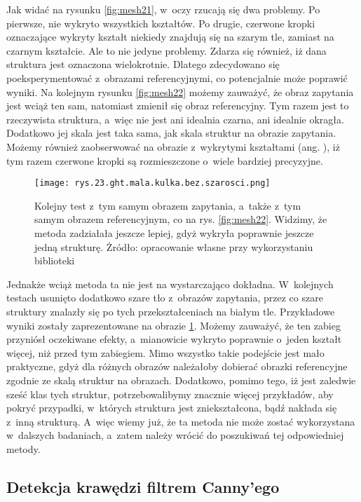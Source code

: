 Jak widać na rysunku \ref{fig:mesh21}, w~oczy rzucają się dwa problemy. Po pierwsze, nie wykryto wszystkich kształtów. Po drugie, czerwone kropki oznaczające wykryty kształt niekiedy znajdują się na szarym tle, zamiast na czarnym kształcie. Ale to nie jedyne problemy. Zdarza się również, iż dana struktura jest oznaczona wielokrotnie. Dlatego zdecydowano się poeksperymentować z~obrazami referencyjnymi, co potencjalnie może poprawić wyniki. Na kolejnym rysunku \ref{fig:mesh22} możemy zauważyć, że obraz zapytania jest wciąż ten sam, natomiast zmienił się obraz referencyjny. Tym razem jest to rzeczywista struktura, a~więc nie jest ani idealnia czarna, ani idealnie okragła. Dodatkowo jej skala jest taka sama, jak skala struktur na obrazie zapytania. Możemy również zaobserwować na obrazie z~wykrytymi kształtami (ang. ), iż tym razem czerwone kropki są rozmieszczone o~wiele bardziej precyzyjne. 
\begin{figure}[h]
    \centering
    \texttt{[image: rys.23.ght.mala.kulka.bez.szarosci.png]}
    \caption{Kolejny test z~tym samym obrazem zapytania, a~także z~tym samym obrazem referencyjnym, co na rys. \ref{fig:mesh22}. Widzimy, że metoda zadziałała jeszcze lepiej, gdyż wykryła poprawnie jeszcze jedną strukturę. Żródło: opracowanie własne przy wykorzystaniu biblioteki }
    \label{fig:mesh23}
\end{figure}
Jednakże wciąż metoda ta nie jest na wystarczająco dokładna. W~kolejnych testach usunięto dodatkowo szare tło z~obrazów zapytania, przez co szare struktury znalazły się po tych przekształceniach na białym tle. Przykładowe wyniki zostały zaprezentowane na obrazie \ref{fig:mesh23}. Możemy zauważyć, że ten zabieg przyniósł oczekiwane efekty, a~mianowicie wykryto poprawnie o~jeden kształt więcej, niż przed tym zabiegiem.
Mimo wszystko takie podejście jest mało praktyczne, gdyż dla różnych obrazów należałoby dobierać obrazki referencyjne zgodnie ze skalą struktur na obrazach. Dodatkowo, pomimo tego, iż jest zaledwie sześć klas tych struktur, potrzebowalibymy znacznie więcej przykładów, aby pokryć przypadki, w~których struktura jest zniekształcona, bądź nakłada się z~inną strukturą. A~więc wiemy już, że ta metoda nie może zostać wykorzystana w~dalszych badaniach, a~zatem należy wrócić do poszukiwań tej odpowiedniej metody.

\subsection{Detekcja krawędzi filtrem Canny'ego}
\label{canny}


